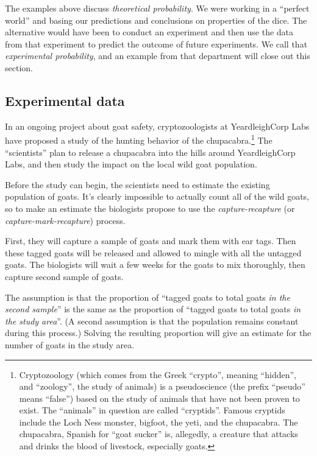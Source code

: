 The examples above discuss \textit{theoretical probability}. We were working in a ``perfect world'' and basing our predictions and conclusions on properties of the dice. The alternative would have been to conduct an experiment and then use the data from that experiment to predict the outcome of future experiments. We call that \textit{experimental probability}, and an example from that department will close out this section.

\subsection{Experimental data}

In an ongoing project about goat safety, cryptozoologists at YeardleighCorp Labs have proposed a study of the hunting behavior of the chupacabra.\footnote{Cryptozoology (which comes from the Greek ``crypto'', meaning ``hidden'', and ``zoology'', the study of animals) is a pseudoscience (the prefix ``pseudo'' means ``false'') based on the study of animals that have not been proven to exist. The ``animals'' in question are called ``cryptids''. Famous cryptids include the Loch Ness monster, bigfoot, the yeti, and the chupacabra. The chupacabra, Spanish for ``goat sucker'' is, allegedly, a creature that attacks and drinks the blood of livestock, especially goats.} The ``scientists'' plan to release a chupacabra into the hills around YeardleighCorp Labs, and then study the impact on the local wild goat population.


Before the study can begin, the scientists need to estimate the existing population of goats. It's clearly impossible to actually count all of the wild goats, so to make an estimate the biologists propose to use the \textit{capture-recapture} (or \textit{capture-mark-recapture}) process.

First, they will capture a sample of goats and mark them with ear tags. Then these tagged goats will be released and allowed to mingle with all the untagged goats. The biologists will wait a few weeks for the goats to mix thoroughly, then capture second sample of goats.

The assumption is that the proportion of ``tagged goats to total goats \textit{in the second sample}'' is the same as the proportion of ``tagged goats to total goats \textit{in the study area}''. (A second assumption is that the population remains constant during this process.) Solving the resulting proportion will give an estimate for the number of goats in the study area.

